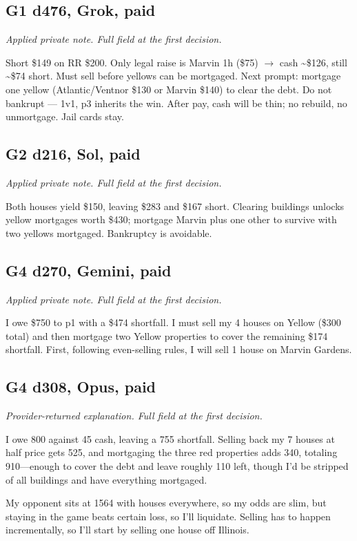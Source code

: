 \subsection*{G1 d476, Grok, paid}
{\small\textit{Applied private note. Full field at the first decision.}\par Short \$149 on RR \$200. Only legal raise is Marvin 1h (\$75) \(\rightarrow\) cash \textasciitilde{}\$126, still \textasciitilde{}\$74 short. Must sell before yellows can be mortgaged. Next prompt: mortgage one yellow (Atlantic/Ventnor \$130 or Marvin \$140) to clear the debt. Do not bankrupt — 1v1, p3 inherits the win. After pay, cash will be thin; no rebuild, no unmortgage. Jail cards stay.\par}

\subsection*{G2 d216, Sol, paid}
{\small\textit{Applied private note. Full field at the first decision.}\par Both houses yield \$150, leaving \$283 and \$167 short. Clearing buildings unlocks yellow mortgages worth \$430; mortgage Marvin plus one other to survive with two yellows mortgaged. Bankruptcy is avoidable.\par}

\subsection*{G4 d270, Gemini, paid}
{\small\textit{Applied private note. Full field at the first decision.}\par I owe \$750 to p1 with a \$474 shortfall. I must sell my 4 houses on Yellow (\$300 total) and then mortgage two Yellow properties to cover the remaining \$174 shortfall. First, following even-selling rules, I will sell 1 house on Marvin Gardens.\par}

\subsection*{G4 d308, Opus, paid}
{\small\textit{Provider-returned explanation. Full field at the first decision.}\par I owe 800 against 45 cash, leaving a 755 shortfall. Selling back my 7 houses at half price gets 525, and mortgaging the three red properties adds 340, totaling 910—enough to cover the debt and leave roughly 110 left, though I'd be stripped of all buildings and have everything mortgaged.\par 
\par 
My opponent sits at 1564 with houses everywhere, so my odds are slim, but staying in the game beats certain loss, so I'll liquidate. Selling has to happen incrementally, so I'll start by selling one house off Illinois.\par 
\par 
\par}

